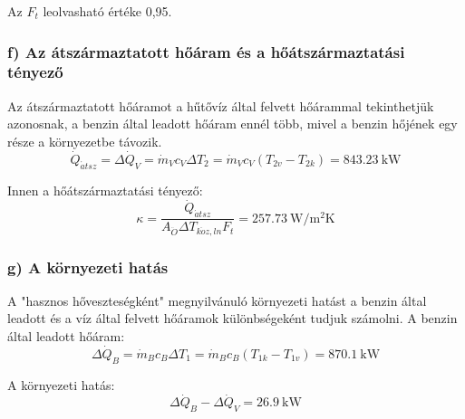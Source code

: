 Az $F_t$ leolvasható értéke 0,95.

\subsubsection*{f) Az átszármaztatott hőáram és a hőátszármaztatási tényező}
Az átszármaztatott hőáramot a hűtővíz által felvett hőárammal tekinthetjük azonosnak, a benzin által leadott hőáram ennél több, mivel a benzin hőjének egy része a környezetbe távozik.
\begin{equation}
	\dot{Q}_{\acute{a}tsz} = \Delta \dot{Q}_{V} = \dot{m}_V c_V \Delta T_2 = \dot{m}_V c_V \left(T_{2v} - T_{2k}\right) = \SI{843.23}{\kilo\watt}
\end{equation}

Innen a hőátszármaztatási tényező:
\begin{equation}
	\kappa = \dfrac{\dot{Q}_{\acute{a}tsz}}{A_{\ddot{O}} \Delta T_{k\ddot{o}z, ln} F_t} = \SI{257.73}{\watt\per\meter\squared\kelvin}
\end{equation}

\subsubsection*{g) A környezeti hatás}
A "hasznos hőveszteségként" megnyilvánuló környezeti hatást a benzin által leadott és a víz által felvett hőáramok különbségeként tudjuk számolni. A benzin által leadott hőáram:
\begin{equation}
	\Delta \dot{Q}_{B} = \dot{m}_B c_B \Delta T_1 = \dot{m}_B c_B \left(T_{1k} - T_{1v}\right) = \SI{870.1}{\kilo\watt}
\end{equation}

A környezeti hatás:
\begin{equation}
	\Delta \dot{Q}_{B} - \Delta \dot{Q}_{V} = \SI{26.9}{\kilo\watt}
\end{equation}

\pagebreak
